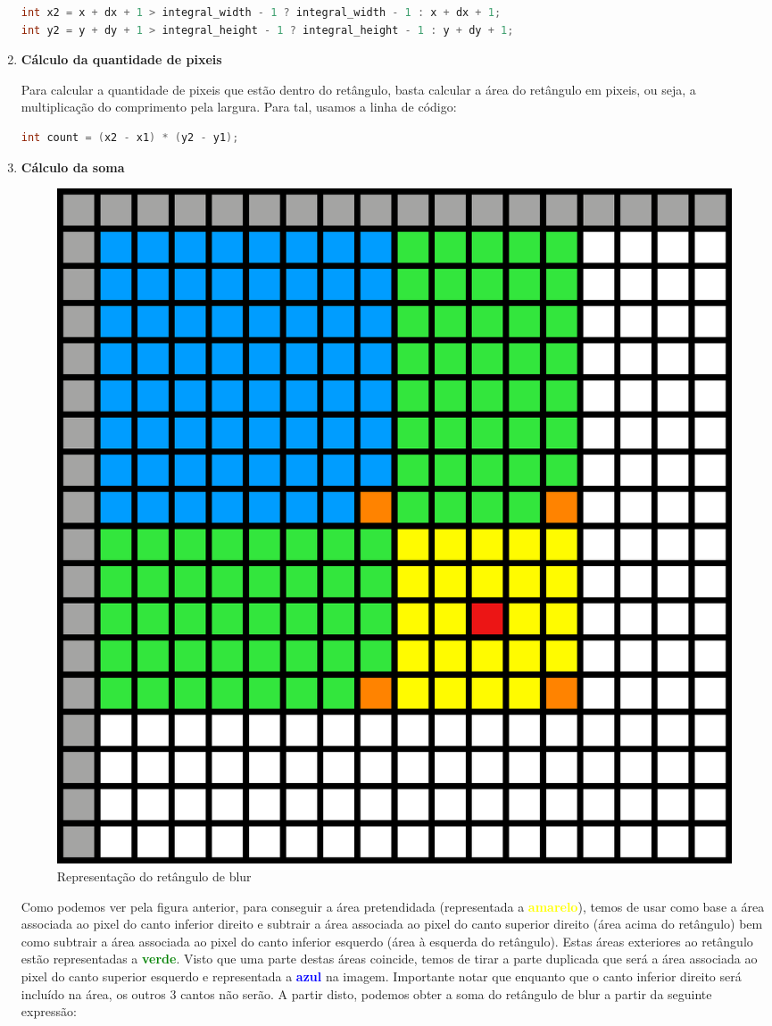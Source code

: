 \begin{enumerate}
{\begin{enumerate}
{        \begin{lstlisting}[language=C]
int x2 = x + dx + 1 > integral_width - 1 ? integral_width - 1 : x + dx + 1;
int y2 = y + dy + 1 > integral_height - 1 ? integral_height - 1 : y + dy + 1;
        \end{lstlisting}
    }
\end{enumerate}
}

\pagebreak

\item {
\textbf{Cálculo da quantidade de pixeis}

Para calcular a quantidade de pixeis que estão dentro do retângulo, basta calcular a área do retângulo em pixeis, ou seja, a multiplicação do comprimento pela largura. Para tal, usamos a linha de código:

\begin{lstlisting}[language=C]
    int count = (x2 - x1) * (y2 - y1);
\end{lstlisting}
}

\item {
\textbf{Cálculo da soma}

\begin{figure}[H]
    \centering
    \includegraphics[width=0.4\linewidth]{images/rectangle-area.png}
    \caption{Representação do retângulo de blur}
\end{figure}

Como podemos ver pela figura anterior, para conseguir a área pretendidada (representada a \textcolor{yellow}{\textbf{amarelo}}), temos de usar como base a área associada ao pixel do canto inferior direito e subtrair a área associada ao pixel do canto superior direito (área acima do retângulo) bem como subtrair a área associada ao pixel do canto inferior esquerdo (área à esquerda do retângulo). Estas áreas exteriores ao retângulo estão representadas a \textcolor{green}{\textbf{verde}}. Visto que uma parte destas áreas coincide, temos de tirar a parte duplicada que será a área associada ao pixel do canto superior esquerdo e representada a \textcolor{blue}{\textbf{azul}} na imagem. Importante notar que enquanto que o canto inferior direito será incluído na área, os outros 3 cantos não serão. A partir disto, podemos obter a soma do retângulo de blur a partir da seguinte expressão:

}
\end{enumerate}
